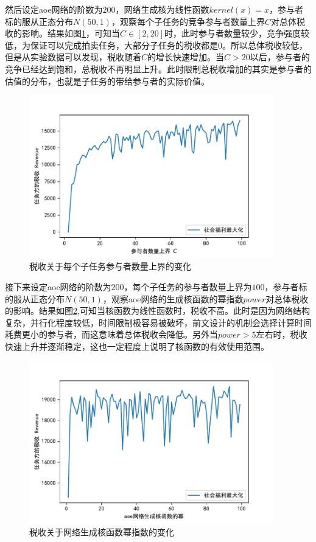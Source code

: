 \documentclass[promaster]{thesis-uestc}
\begin{document}
然后设定aoe网络的阶数为$200$，网络生成核为线性函数$kernel(x)=x$，参与者标的服从正态分布$N(50,1)$，观察每个子任务的竞争参与者数量上界$C$对总体税收的影响。结果如图\ref{revenuevsc}，可知当$C \in [2,20]$时，此时参与者数量较少，竞争强度较低，为保证可以完成拍卖任务，大部分子任务的税收都是0。所以总体税收较低，但是从实验数据可以发现，税收随着$C$的增长快速增加。当$C > 20$以后，参与者的竞争已经达到饱和，总税收不再明显上升。此时限制总税收增加的其实是参与者的估值的分布，也就是子任务的带给参与者的实际价值。

\begin{figure}[H]
    \includegraphics[width=300pt]{exp/revenuevsc.pdf}
    \caption{税收关于每个子任务参与者数量上界的变化}
    \label{revenuevsc}
\end{figure}

接下来设定aoe网络的阶数为$200$，每个子任务的参与者数量上界为$100$，参与者标的服从正态分布$N(50,1)$，观察aoe网络的生成核函数的幂指数$power$对总体税收的影响。结果如图\ref{revenuevspower},可知当核函数为线性函数时，税收不高。此时是因为网络结构复杂，并行化程度较低，时间限制极容易被破坏，前文设计的机制会选择计算时间耗费更小的参与者，而这意味着总体税收会降低。另外当$power>5$左右时，税收快速上升并逐渐稳定，这也一定程度上说明了核函数的有效使用范围。

\begin{figure}[H]
    \includegraphics[width=300pt]{exp/revenuevspower.pdf}
    \caption{税收关于网络生成核函数幂指数的变化}
    \label{revenuevspower}
\end{figure}
\end{document}

